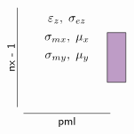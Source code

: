 \documentclass[10pt]{article}
\begin{document}
\[\begin{tikzpicture}
%
 \node[draw=black,fill=moradoAmor!40,minimum width=1.5em,minimum height=4em,rectangle]  at (4em,0em) {}; %
%
\node[]  at (0em,3em) {$\varepsilon_{z}, \; \sigma_{ez}$};
\node[]  at (0em,1.5em) {$\sigma_{mx}, \; \mu_{x}$};
\node[]  at (0em,0em) {$\sigma_{my}, \; \mu_{y}$};
%
\draw[] (-4em,-4em) -- (-4em,4em);
\node[rotate=90]  at (-4.5em,0) {\small{\sf nx - 1}};
\draw[] (-3.5em,-4.5em) -- (3.5em,-4.5em);
\node[]  at (0,-5.2em) {\small{\sf pml}};
%
\end{tikzpicture}
\]
\end{document}
